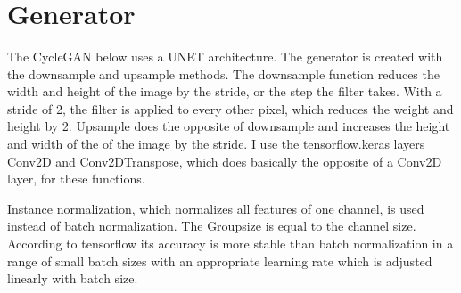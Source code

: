 \documentclass[11pt]{article}
\begin{document}
    \begin{center}
    \end{center}
    { \hspace*{\fill} \\}
    
    \begin{center}
    \end{center}
    { \hspace*{\fill} \\}
    
    \begin{center}
    \end{center}
    { \hspace*{\fill} \\}
    
    \begin{center}
    \end{center}
    { \hspace*{\fill} \\}
    
    \begin{center}
    \end{center}
    { \hspace*{\fill} \\}
    
    \section{Generator}\label{generator}

The CycleGAN below uses a UNET architecture. The generator is created
with the downsample and upsample methods. The downsample function
reduces the width and height of the image by the stride, or the step the
filter takes. With a stride of 2, the filter is applied to every other
pixel, which reduces the weight and height by 2. Upsample does the
opposite of downsample and increases the height and width of the of the
image by the stride. I use the tensorflow.keras layers Conv2D and
Conv2DTranspose, which does basically the opposite of a Conv2D layer,
for these functions.

Instance normalization, which normalizes all features of one channel, is
used instead of batch normalization. The Groupsize is equal to the
channel size. According to tensorflow its accuracy is more stable than
batch normalization in a range of small batch sizes with an appropriate
learning rate which is adjusted linearly with batch size.
\end{document}
